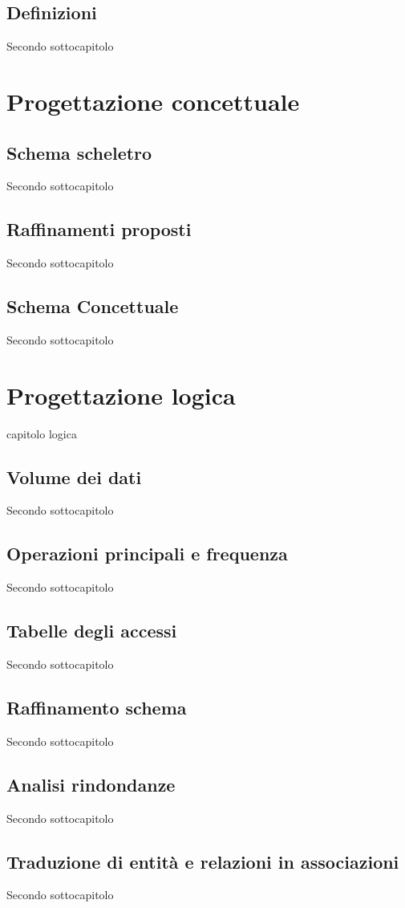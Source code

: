 ﻿\documentclass[a4paper,12pt]{report}
\begin{document}
\section{Definizioni}
Secondo sottocapitolo


\chapter{Progettazione concettuale}
\section{Schema scheletro}
Secondo sottocapitolo
\section{Raffinamenti proposti}
Secondo sottocapitolo
\section{Schema Concettuale}
Secondo sottocapitolo


\chapter{Progettazione logica}
capitolo logica
\section{Volume dei dati}
Secondo sottocapitolo
\section{Operazioni principali e frequenza}
Secondo sottocapitolo
\section{Tabelle degli accessi}
Secondo sottocapitolo
\section{Raffinamento schema}
Secondo sottocapitolo
\section{Analisi rindondanze}
Secondo sottocapitolo
\section{Traduzione di entità e relazioni in associazioni}
Secondo sottocapitolo
\end{document}
